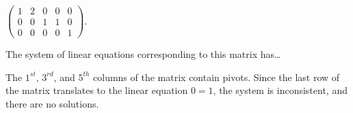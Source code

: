 \documentclass{ximera}
\begin{document}
\begin{exercise} \label{c2.3.7b}
$\left(\begin{array}{rrrr|r}
 1  &  2 & 0 & 0 & 0\\
 0  &  0 & 1 & 1 & 0\\
 0  &  0 & 0 & 0 & 1
       \end{array}\right)$.
     \begin{selectAll}
     \end{selectAll}
     \begin{exercise}
       The system of linear equations corresponding to this matrix has\ldots
       \begin{multipleChoice}
       \end{multipleChoice}

\begin{solution}
The $1^{st}$, $3^{rd}$, and $5^{th}$ columns of the matrix
contain pivots.  Since the last row of the matrix translates to the linear
equation $0 = 1$, the system is inconsistent, and there are no solutions.

\end{solution}
     \end{exercise}

\begin{solution}


\end{solution}
\end{exercise}
\end{document}
